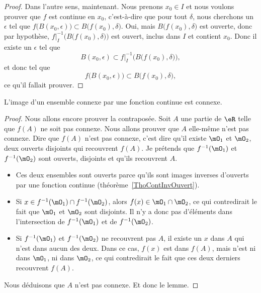 \begin{proof}
	Dans l'autre sens, maintenant. Nous prenons \( x_0\in I\) et nous voulons prouver que \( f\) est continue en \( x_0\), c'est-à-dire que pour tout \( \delta\), nous cherchons un \( \epsilon\) tel que \( f\big( B(x_0,\epsilon) \big)\subset B\big( f(x_0),\delta \big)\). Oui, mais \( B\big( f(x_0),\delta \big)\) est ouverte, donc par hypothèse, \( f|_I^{-1}\Big( B\big( f(x_0),\delta \big) \Big)\) est ouvert, inclus dans \( I\) et contient \( x_0\). Donc il existe un \( \epsilon\) tel que
	\[
		B(x_0,\epsilon)\subset f|_I^{-1}\Big( B\big( f(x_0),\delta \big) \Big),
	\]
	et donc tel que
	\[
		f\big( B(x_0,\epsilon) \big)\subset B\big( f(x_0),\delta \big),
	\]
	ce qu'il fallait prouver.
\end{proof}

\begin{lemma}   \label{LemConncontconn}
	L'image d'un ensemble connexe par une fonction continue est connexe.
\end{lemma}

\begin{proof}
	Nous allons encore prouver la contraposée. Soit \( A\) une partie de \( \eR\) telle que \( f(A)\) ne soit pas connexe. Nous allons prouver que \( A\) elle-même n'est pas connexe. Dire que \( f(A)\) n'est pas connexe, c'est dire qu'il existe \( \mO_1\) et \( \mO_2\), deux ouverts disjoints qui recouvrent \( f(A)\). Je prétends que \( f^{-1}(\mO_1)\) et \( f^{-1}(\mO_2)\) sont ouverts, disjoints et qu'ils recouvrent \( A\).
	\begin{itemize}
		\item Ces deux ensembles sont ouverts parce qu'ils sont images inverses d'ouverts par une fonction continue (théorème~\ref{ThoContInvOuvert}).
		\item Si \( x\in f^{-1}(\mO_1)\cap f^{-1}(\mO_2)\), alors \( f(x)\in \mO_1\cap\mO_2\), ce qui contredirait le fait que \( \mO_1\) et \( \mO_2\) sont disjoints. Il n'y a donc pas d'éléments dans l'intersection de \( f^{-1}(\mO_1)\) et de \( f^{-1}(\mO_2)\).
		\item Si \( f^{-1}(\mO_1)\) et \( f^{-1}(\mO_2)\) ne recouvrent pas \( A\), il existe un \( x\) dans \( A\) qui n'est dans aucun des deux. Dans ce cas, \( f(x)\) est dans \( f(A)\), mais n'est ni dans \( \mO_1\), ni dans \( \mO_2\), ce qui contredirait le fait que ces deux derniers recouvrent \( f(A)\).
	\end{itemize}
	Nous déduisons que \( A\) n'est pas connexe. Et donc le lemme.
\end{proof}

